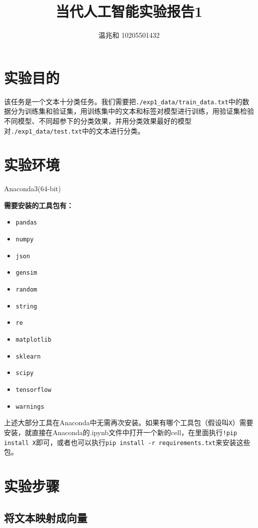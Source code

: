 \documentclass{article}
\title{当代人工智能实验报告1}
\author{温兆和 10205501432}
\begin{document}
\maketitle

\section{实验目的}

该任务是一个文本十分类任务。我们需要把\lstinline|./exp1_data/train_data.txt|中的数据分为训练集和验证集，用训练集中的文本和标签对模型进行训练，用验证集检验不同模型、不同超参下的分类效果，并用分类效果最好的模型对\lstinline|./exp1_data/test.txt|中的文本进行分类。

\section{实验环境}
Anaconda3(64-bit)

\textbf{需要安装的工具包有：}
\begin{spacing}{0.5}
\begin{itemize}
\item \lstinline|pandas|
\item \lstinline|numpy|
\item \lstinline|json|
\item \lstinline|gensim|
\item \lstinline|random|
\item \lstinline|string|
\item \lstinline|re|
\item \lstinline|matplotlib|
\item \lstinline|sklearn|
\item \lstinline|scipy|
\item \lstinline|tensorflow|
\item \lstinline|warnings|
\end{itemize}
\end{spacing}

上述大部分工具在Anaconda中无需再次安装。如果有哪个工具包（假设叫\lstinline|X|）需要安装，就直接在Anaconda的.ipynb文件中打开一个新的cell，在里面执行\lstinline|!pip install X|即可，或者也可以执行\lstinline|pip install -r requirements.txt|来安装这些包。
\section{实验步骤}
\subsection{将文本映射成向量}
\end{document}
